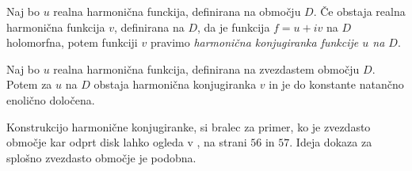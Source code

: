\documentclass[mat1]{fmfdelo}
\begin{document}
    \begin{definicija}
        Naj bo $u$ realna harmonična funckija, definirana na območju $D$. Če obstaja realna harmonična funkcija $v$, definirana na $D$, da je funkcija $f = u + iv$ na $D$ holomorfna, potem funkciji $v$ pravimo \emph{harmonična konjugiranka funkcije $u$ na $D$}.    
    \end{definicija}

    \begin{trditev}
        \label{konj}
        Naj bo $u$ realna harmonična funkcija, definirana na zvezdastem območju $D$. Potem za $u$ na $D$ obstaja harmonična konjugiranka $v$ in je do konstante natančno enolično določena. 
    \end{trditev}
    \begin{dokaz}
        Konstrukcijo harmonične konjugiranke, si bralec za primer, ko je zvezdasto območje kar odprt disk lahko ogleda v \cite{osnova}, na strani $56$ in $57$. 
        Ideja dokaza za splošno zvezdasto območje je podobna. 
    \end{dokaz}
\end{document}

